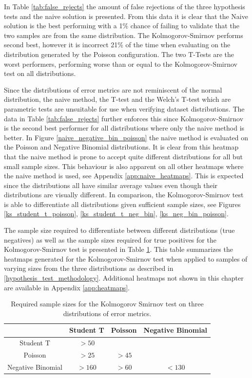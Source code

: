 In Table \ref{tab:false_rejects} the amount of false rejections of the three hypothesis tests and the naive solution is presented. From this data it is clear that the Naive solution is the best performing with a 1\% chance of failing to validate that the two samples are from the same distribution. The Kolmogorov-Smirnov performs second best, however it is incorrect 21\% of the time when evaluating on the distribution generated by the Poisson configuration. The two T-Tests are the worst performers, performing worse than or equal to the Kolmogorov-Smirnov test on all distributions.

Since the distributions of error metrics are not reminiscent of the normal distribution, the naive method, the T-test and the Welch's T-test which are parametric tests are unsuitable for use when verifying dataset distributions. The data in Table \ref{tab:false_rejects} further enforces this since Kolmogorov-Smirnov is the second best performer for all distributions where only the naive method is better. In Figure \ref{naive_negative_bin_poisson} the naive method is evaluated on the Poisson and Negative Binomial distributions. It is clear from this heatmap that the naive method is prone to accept quite different distributions for all but small sample sizes. This behaviour is also apparent on all other heatmaps where the naive method is used, see Appendix \ref{app:naive_heatmaps}. This is expected since the distributions all have similar average values even though their distributions are visually different. In comparison, the Kolmogorov-Smirnov test is able to differentiate all distributions given sufficient sample sizes, see Figures \ref{ks_student_t_poisson}, \ref{ks_student_t_neg_bin}, \ref{ks_neg_bin_poisson}.

The sample size required to differentiate between different distributions (true negatives) as well as the sample sizes required for true positives for the Kolmogorov-Smirnov test is presented in Table \ref{tab:required_sample_sizes}. This table summarizes the heatmaps generated for the Kolmogorov-Smirnov test when applied to samples of varying sizes from the three distributions as described in \ref{hypothesis_test_methodology}. Additional heatmaps not shown in this chapter are available in Appendix \ref{app:heatmaps}.


\begin{table}[htp]
  \centering
  \begin{tabular}{cccc}
                      & Student T & Poisson & Negative Binomial \\
    \hline
    Student T         & \(>50\)   &         &                   \\
    \hline
    Poisson           & \(>25\)   & \(>45\) &                   \\
    \hline
    Negative Binomial & \(>160\)  & \(>60\) & \(<130\)          \\
  \end{tabular}
  \caption{Required sample sizes for the Kolmogorov Smirnov test on three distributions of error metrics.}
  \label{tab:required_sample_sizes}
\end{table}

